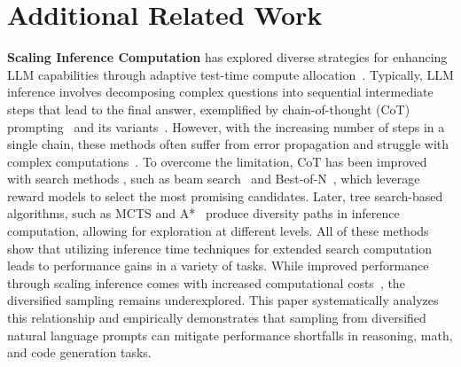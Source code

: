 \section{Additional Related Work}
\label{sec:relatedwork}

\textbf{Scaling Inference Computation} has explored diverse strategies for enhancing LLM capabilities through adaptive test-time compute allocation~\cite{snell2024scaling, brown2024large, manvi2024adaptive, guan2025rstarmathsmallllmsmaster, chen2024think}.
Typically, LLM inference involves decomposing complex questions into sequential intermediate steps that lead to the final
answer, exemplified by chain-of-thought (CoT) prompting~\cite{wei2022chain, sprague2024cotcot, wang2024chainofthoughtr} and its variants~\cite{kojima2022large,zhouleast, wangself, li2023making}.
However, with the increasing number of steps in a single chain, these methods often suffer from error propagation and struggle with complex computations~\cite{chenprogram}.
To overcome the limitation, CoT \citep{li2024chainthought} has been improved with search methods \citep{zhang2024chain}, such as beam search~\cite{xie2024self} and Best-of-N~\cite{snell2024scaling}, which leverage reward models to select the most promising candidates.
Later, tree search-based algorithms, such as MCTS and A*~\cite{yao2024tree, luo2024improve, zhang2024restmcts, hao2023reasoning,zhou2024language,choi2023kcts, yao2024mulberry, chen2024treesearchusefulllm, xie2024montecarlotreesearch, zhang2025lessonsdevelopingprocessreward} produce diversity paths in inference computation, allowing for exploration at different levels.
All of these methods show that utilizing inference time techniques for extended search computation leads to performance gains in a variety of tasks.
While improved performance through scaling inference comes with increased computational costs~\cite{anonymous2025inference}, the diversified sampling remains underexplored. 
This paper systematically analyzes this relationship and empirically demonstrates that sampling from diversified natural language prompts can mitigate performance shortfalls in reasoning, math, and code generation tasks.


